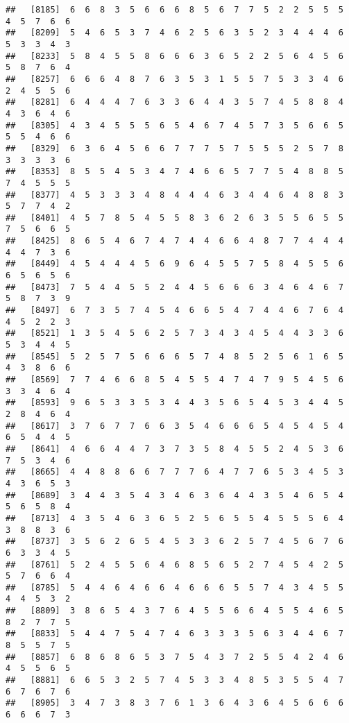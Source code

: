 \documentclass[
]{book}
\begin{document}
\begin{verbatim}
##   [8185]  6  6  8  3  5  6  6  6  8  5  6  7  7  5  2  2  5  5  5  4  5  7  6  6
##   [8209]  5  4  6  5  3  7  4  6  2  5  6  3  5  2  3  4  4  4  6  5  3  3  4  3
##   [8233]  5  8  4  5  5  8  6  6  6  3  6  5  2  2  5  6  4  5  6  5  8  7  6  4
##   [8257]  6  6  6  4  8  7  6  3  5  3  1  5  5  7  5  3  3  4  6  2  4  5  5  6
##   [8281]  6  4  4  4  7  6  3  3  6  4  4  3  5  7  4  5  8  8  4  4  3  6  4  6
##   [8305]  4  3  4  5  5  5  6  5  4  6  7  4  5  7  3  5  6  6  5  5  5  4  6  6
##   [8329]  6  3  6  4  5  6  6  7  7  7  5  7  5  5  5  2  5  7  8  3  3  3  3  6
##   [8353]  8  5  5  4  5  3  4  7  4  6  6  5  7  7  5  4  8  8  5  7  4  5  5  5
##   [8377]  4  5  3  3  3  4  8  4  4  4  6  3  4  4  6  4  8  8  3  5  7  7  4  2
##   [8401]  4  5  7  8  5  4  5  5  8  3  6  2  6  3  5  5  6  5  5  7  5  6  6  5
##   [8425]  8  6  5  4  6  7  4  7  4  4  6  6  4  8  7  7  4  4  4  4  4  7  3  6
##   [8449]  4  5  4  4  4  5  6  9  6  4  5  5  7  5  8  4  5  5  6  6  5  6  5  6
##   [8473]  7  5  4  4  5  5  2  4  4  5  6  6  6  3  4  6  4  6  7  5  8  7  3  9
##   [8497]  6  7  3  5  7  4  5  4  6  6  5  4  7  4  4  6  7  6  4  4  5  2  2  3
##   [8521]  1  3  5  4  5  6  2  5  7  3  4  3  4  5  4  4  3  3  6  5  3  4  4  5
##   [8545]  5  2  5  7  5  6  6  6  5  7  4  8  5  2  5  6  1  6  5  4  3  8  6  6
##   [8569]  7  7  4  6  6  8  5  4  5  5  4  7  4  7  9  5  4  5  6  3  3  4  6  4
##   [8593]  9  6  5  3  3  5  3  4  4  3  5  6  5  4  5  3  4  4  5  2  8  4  6  4
##   [8617]  3  7  6  7  7  6  6  3  5  4  6  6  6  5  4  5  4  5  4  6  5  4  4  5
##   [8641]  4  6  6  4  4  7  3  7  3  5  8  4  5  5  2  4  5  3  6  7  5  3  4  6
##   [8665]  4  4  8  8  6  6  7  7  7  6  4  7  7  6  5  3  4  5  3  4  3  6  5  3
##   [8689]  3  4  4  3  5  4  3  4  6  3  6  4  4  3  5  4  6  5  4  5  6  5  8  4
##   [8713]  4  3  5  4  6  3  6  5  2  5  6  5  5  4  5  5  5  6  4  3  8  8  3  6
##   [8737]  3  5  6  2  6  5  4  5  3  3  6  2  5  7  4  5  6  7  6  6  3  3  4  5
##   [8761]  5  2  4  5  5  6  4  6  8  5  6  5  2  7  4  5  4  2  5  5  7  6  6  4
##   [8785]  5  4  4  6  4  6  6  4  6  6  6  5  5  7  4  3  4  5  5  4  4  5  3  2
##   [8809]  3  8  6  5  4  3  7  6  4  5  5  6  6  4  5  5  4  6  5  8  2  7  7  5
##   [8833]  5  4  4  7  5  4  7  4  6  3  3  3  5  6  3  4  4  6  7  8  5  5  7  5
##   [8857]  6  8  6  8  6  5  3  7  5  4  3  7  2  5  5  4  2  4  6  4  5  5  6  5
##   [8881]  6  6  5  3  2  5  7  4  5  3  3  4  8  5  3  5  5  4  7  6  7  6  7  6
##   [8905]  3  4  7  3  8  3  7  6  1  3  6  4  3  6  4  5  6  6  6  6  6  6  7  3

\end{verbatim}
\end{document}
